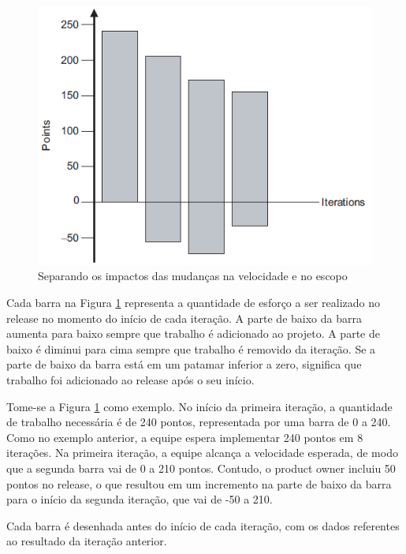 \documentclass[a4paper,abntfigtabnum,noindentfirst]{abnt}
\begin{document}
\begin{figure}
  \caption{Separando os impactos das mudanças na velocidade e no escopo}
  \label{burndown-bar-chart}
  \begin{center}
  \includegraphics[scale=0.6]{burndown-bar-chart}
  \end{center}
\end{figure}

Cada barra na Figura \ref{burndown-bar-chart} representa a quantidade de esforço a ser realizado no release no momento do início de cada iteração. A parte de baixo da barra aumenta para baixo sempre que trabalho é adicionado ao projeto. A parte de baixo é diminui para cima sempre que trabalho é removido da iteração. Se a parte de baixo da barra está em um patamar inferior a zero, significa que trabalho foi adicionado ao release após o seu início.

Tome-se a Figura \ref{burndown-bar-chart} como exemplo. No início da primeira iteração, a quantidade de trabalho necessária é de 240 pontos, representada por uma barra de 0 a 240. Como no exemplo anterior, a equipe espera implementar 240 pontos em 8 iterações. Na primeira iteração, a equipe alcança a velocidade esperada, de modo que a segunda barra vai de 0 a 210 pontos. Contudo, o product owner incluiu 50 pontos no release, o que resultou em um incremento na parte de baixo da barra para o início da segunda iteração, que vai de -50 a 210. 

Cada barra é desenhada antes do início de cada iteração, com os dados referentes ao resultado da iteração anterior.
\end{document}

